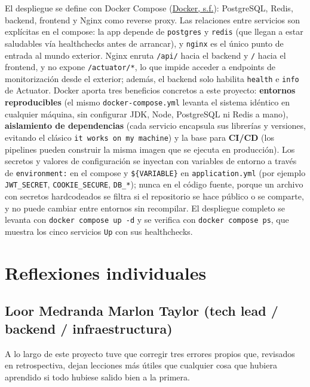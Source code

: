 \documentclass[12pt,a4paper]{article}
\begin{document}
El despliegue se define con Docker Compose (\hyperlink{ref:docker}{Docker, s.f.}): PostgreSQL, Redis, backend, frontend y Nginx
como reverse proxy. Las relaciones entre servicios son explícitas en el compose: la app
depende de \texttt{postgres} y \texttt{redis} (que llegan a estar saludables vía
healthchecks antes de arrancar), y \texttt{nginx} es el único punto de entrada al mundo
exterior. Nginx enruta \texttt{/api/} hacia el backend y \texttt{/} hacia el frontend, y
no expone \texttt{/actuator/*}, lo que impide acceder a endpoints de monitorización desde
el exterior; además, el backend solo habilita \texttt{health} e \texttt{info} de
Actuator. Docker aporta tres beneficios concretos a este proyecto: \textbf{entornos
reproducibles} (el mismo \texttt{docker-compose.yml} levanta el sistema idéntico en
cualquier máquina, sin configurar JDK, Node, PostgreSQL ni Redis a mano),
\textbf{aislamiento de dependencias} (cada servicio encapsula sus librerías y versiones,
evitando el clásico \texttt{it works on my machine}) y la base para \textbf{CI/CD} (los
pipelines pueden construir la misma imagen que se ejecuta en producción). Los secretos y
valores de configuración se inyectan con variables de entorno a través de
\texttt{environment:} en el compose y \texttt{\$\{VARIABLE\}} en \texttt{application.yml}
(por ejemplo \texttt{JWT\_SECRET}, \texttt{COOKIE\_SECURE}, \texttt{DB\_*}); nunca en el
código fuente, porque un archivo con secretos hardcodeados se filtra si el repositorio se
hace público o se comparte, y no puede cambiar entre entornos sin recompilar. El
despliegue completo se levanta con \texttt{docker compose up -d} y se verifica con
\texttt{docker compose ps}, que muestra los cinco servicios \texttt{Up} con sus
healthchecks.

\newpage

\section{Reflexiones individuales}

\subsection{Loor Medranda Marlon Taylor (tech lead / backend / infraestructura)}

A lo largo de este proyecto tuve que corregir tres errores propios que, revisados en
retrospectiva, dejan lecciones más útiles que cualquier cosa que hubiera aprendido si
todo hubiese salido bien a la primera.
\end{document}
